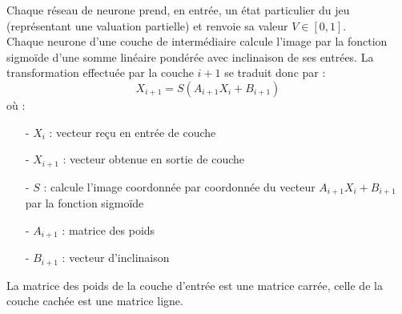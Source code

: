 \documentclass{article}
\begin{document}
Chaque réseau de neurone prend, en entrée, un état particulier du jeu (représentant une valuation partielle) et renvoie sa valeur $V\in[0,1]$.\\
Chaque neurone d'une couche de intermédiaire calcule l'image par la fonction sigmoïde d'une somme linéaire pondérée avec inclinaison de ses entrées. La transformation effectuée par la couche $i+1$ se traduit donc par :
\[ X_{i+1} = S(A_{i+1}X_i+B_{i+1}) \]
où :
\begin{enumerate}
\item[-] $X_i$ : vecteur reçu en entrée de couche
\item[-] $X_{i+1}$ : vecteur obtenue en sortie de couche
\item[-] $S$ : calcule l'image coordonnée par coordonnée du vecteur $A_{i+1}X_i+B_{i+1}$ par la fonction sigmoïde
\item[-] $A_{i+1}$ : matrice des poids
\item[-] $B_{i+1}$ : vecteur d'inclinaison
\end{enumerate}
La matrice des poids de la couche d'entrée est une matrice carrée, celle de la couche cachée est une matrice ligne.
\end{document}
